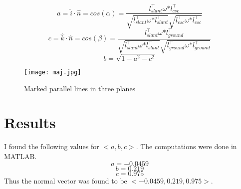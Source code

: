 \documentclass[12pt]{article}
\begin{document}
$$a = \hat{i} \cdot \hat{n}= cos(\alpha) = \dfrac{l_{slant}^\top \omega \mbox{*} l_{csc}^\top}{\sqrt{l_{slant}^\top \omega \mbox{*} l_{slant}^\top}\sqrt{l_{csc}^\top \omega \mbox{*} l_{csc}^\top}} $$
$$c = \hat{k} \cdot \hat{n}= cos(\beta) = \dfrac{l_{slant}^\top \omega \mbox{*} l_{ground}^\top}{\sqrt{l_{slant}^\top \omega \mbox{*} l_{slant}^\top}\sqrt{l_{ground}^\top \omega \mbox{*} l_{ground}^\top}} $$
$$ b = \sqrt{1-a^2-c^2}$$

\begin{figure}[ht!]
    \centering
    \texttt{[image: maj.jpg]}
    \caption{Marked parallel lines in three planes}
    \label{giv}
\end{figure}

\section{Results}
I found the following values for $<a,b,c>$. The computations were done in MATLAB.
$$a = -0.0459$$
$$b = 0.219$$
$$c = 0.975 $$
Thus the normal vector was found to be $<-0.0459,  0.219,0.975 >$.
\end{document}
